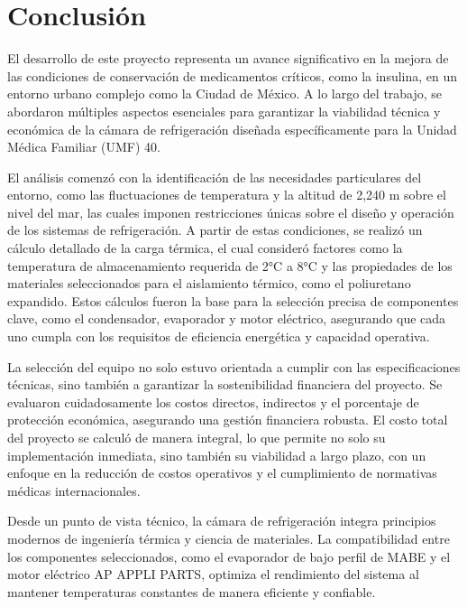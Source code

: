   
  
  \section{Conclusión}
  
  
  El desarrollo de este proyecto representa un avance significativo en la mejora de las condiciones de conservación de medicamentos críticos, como la insulina, en un entorno urbano complejo como la Ciudad de México. A lo largo del trabajo, se abordaron múltiples aspectos esenciales para garantizar la viabilidad técnica y económica de la cámara de refrigeración diseñada específicamente para la Unidad Médica Familiar (UMF) 40.
  
  El análisis comenzó con la identificación de las necesidades particulares del entorno, como las fluctuaciones de temperatura y la altitud de 2,240 m sobre el nivel del mar, las cuales imponen restricciones únicas sobre el diseño y operación de los sistemas de refrigeración. A partir de estas condiciones, se realizó un cálculo detallado de la carga térmica, el cual consideró factores como la temperatura de almacenamiento requerida de 2°C a 8°C y las propiedades de los materiales seleccionados para el aislamiento térmico, como el poliuretano expandido. Estos cálculos fueron la base para la selección precisa de componentes clave, como el condensador, evaporador y motor eléctrico, asegurando que cada uno cumpla con los requisitos de eficiencia energética y capacidad operativa.
  
  La selección del equipo no solo estuvo orientada a cumplir con las especificaciones técnicas, sino también a garantizar la sostenibilidad financiera del proyecto. Se evaluaron cuidadosamente los costos directos, indirectos y el porcentaje de protección económica, asegurando una gestión financiera robusta. El costo total del proyecto se calculó de manera integral, lo que permite no solo su implementación inmediata, sino también su viabilidad a largo plazo, con un enfoque en la reducción de costos operativos y el cumplimiento de normativas médicas internacionales.
  
  Desde un punto de vista técnico, la cámara de refrigeración integra principios modernos de ingeniería térmica y ciencia de materiales. La compatibilidad entre los componentes seleccionados, como el evaporador de bajo perfil de MABE y el motor eléctrico AP APPLI PARTS, optimiza el rendimiento del sistema al mantener temperaturas constantes de manera eficiente y confiable. 
  
